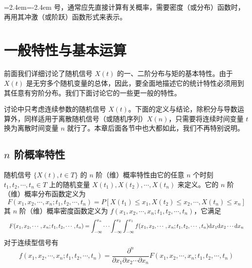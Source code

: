 \documentclass[11pt,openany,UTF8]{ctexbook}
\newcommand{\dif}{\mathrm{d}}                      %
\newenvironment{citemize}
  {\begin{list}{}{\leftmargin=2.4em\itemindent=-2.4em\itemsep=1pt\topsep=3pt\parsep=0pt}}
  {\end{list}}
\begin{document}
\begin{citemize}
号\nobreak，通常应先直接计算有关概率\nobreak，需要密度（或分布\nobreak）函数时\nobreak，再用其冲激（或阶跃\nobreak）函数形式来表示\nobreak。
\end{citemize}

\section{一般特性与基本运算}
前面我们详细讨论了随机信号 $X(t)$ 的一\nobreak、二阶分布与矩的基本特性\nobreak。由于 $X(t)$ 是无穷多个随机变量的总体\nobreak，因此\nobreak，要全面地描述它的统计特性必须用到其任意有穷阶分布\nobreak。我们下面讨论它的一些更一般的特性\nobreak。

讨论中只考虑连续参数的随机信号 $X(t)$\nobreak。下面的定义与结论\nobreak，除积分与导数运算外\nobreak，同样适用于离散随机信号（或随机序列\nobreak）$X(n)$\nobreak，只需要将连续时间变量 $t$ 换为离散时间变量 $n$ 就行了\nobreak。本章后面各节中也大都如此\nobreak，我们不再特别说明\nobreak。

\subsection{$n$ 阶概率特性}
随机信号 $\{X(t),t\in T\}$ 的 $n$ 阶（维\nobreak）概率特性由它的任意 $n$ 个时刻 $t_1,t_2,\cdots,t_n\in T$ 上的随机变量 $X(t_1),X(t_2),\cdots,X(t_n)$ 来定义\nobreak。它的 $n$ 阶（维\nobreak）概率分布函数定义为
\[
F(x_1,x_2,\cdots,x_n;t_1,t_2,\cdots,t_n)=P[X(t_1)\leqslant x_1, X(t_2)\leqslant x_2,\cdots,X(t_n)\leqslant x_n]
\]
其 $n$ 阶（维\nobreak）概率密度函数定义为 $f(x_1,x_2,\cdots,x_n;t_1,t_2,\cdots,t_n)$\nobreak，它满足
\[
\resizebox{\linewidth}{!}{$\displaystyle
F(x_1,x_2,\cdots,x_n;t_1,t_2,\cdots,t_n)
=\int_{-\infty}^{x_n}\cdots\int_{-\infty}^{x_2}\int_{-\infty}^{x_1}
f(x_1,x_2,\cdots,x_n;t_1,t_2,\cdots,t_n)\dif x_1\dif x_2\cdots\dif x_n$}
\]
对于连续型信号有
\[
f(x_1,x_2,\cdots,x_n;t_1,t_2,\cdots,t_n)
=\frac{\partial^n}{\partial x_1\partial x_2\cdots\partial x_n}
F(x_1,x_2,\cdots,x_n;t_1,t_2,\cdots,t_n)
\]
\end{document}
